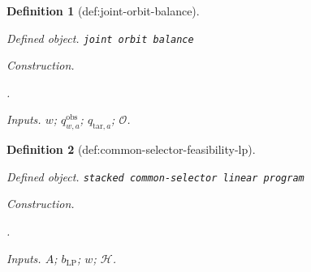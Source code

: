 \documentclass{article}
\newtheorem{definition}{Definition}
\begin{document}
\begin{definition}[def:joint-orbit-balance]\label{def:joint-orbit-balance}
\par\smallskip\noindent\emph{Defined object.} \texttt{joint orbit balance}
\par\smallskip\noindent\emph{Construction.} \par\noindent {}\par\noindent.
\par\smallskip\noindent\emph{Inputs.} \(w\); \(q^{\mathrm{obs}}_{w,a}\); \(q_{\mathrm{tar},a}\); \(\mathcal O\).
\end{definition}

\begin{definition}[def:common-selector-feasibility-lp]\label{def:common-selector-feasibility-lp}
\par\smallskip\noindent\emph{Defined object.} \texttt{stacked common-\allowbreak{}selector linear program}
\par\smallskip\noindent\emph{Construction.} \par\noindent {}\par\noindent.
\par\smallskip\noindent\emph{Inputs.} \(A\); \(b_{\mathrm{LP}}\); \(w\); \(\mathcal H\).
\end{definition}
\end{document}
